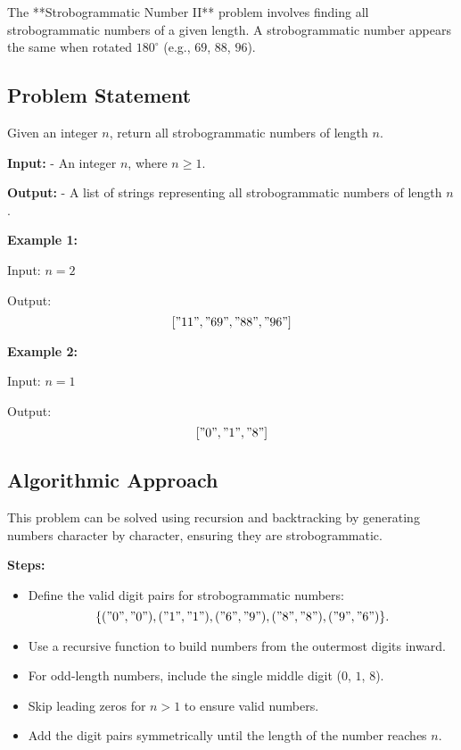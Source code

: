 
\label{problem:Strobogrammatic_Number_II}

The **Strobogrammatic Number II** problem involves finding all strobogrammatic numbers of a given length. A strobogrammatic number appears the same when rotated \(180^\circ\) (e.g., \(69\), \(88\), \(96\)).

\subsection*{Problem Statement}
Given an integer \( n \), return all strobogrammatic numbers of length \( n \).

\textbf{Input:}
- An integer \( n \), where \( n \geq 1 \).

\textbf{Output:}
- A list of strings representing all strobogrammatic numbers of length \( n \).

\textbf{Example 1:}

Input: \( n = 2 \)

Output: \[
["11", "69", "88", "96"]
\]

\textbf{Example 2:}

Input: \( n = 1 \)

Output: \[
["0", "1", "8"]
\]

\subsection*{Algorithmic Approach}
This problem can be solved using recursion and backtracking by generating numbers character by character, ensuring they are strobogrammatic.

\textbf{Steps:}
\begin{itemize}
    \item Define the valid digit pairs for strobogrammatic numbers: 
        \[
        \{
        ("0", "0"), ("1", "1"), ("6", "9"), ("8", "8"), ("9", "6")
        \}.
        \]
    \item Use a recursive function to build numbers from the outermost digits inward.
    \item For odd-length numbers, include the single middle digit (\(0\), \(1\), \(8\)).
    \item Skip leading zeros for \(n > 1\) to ensure valid numbers.
    \item Add the digit pairs symmetrically until the length of the number reaches \(n\).
\end{itemize}

